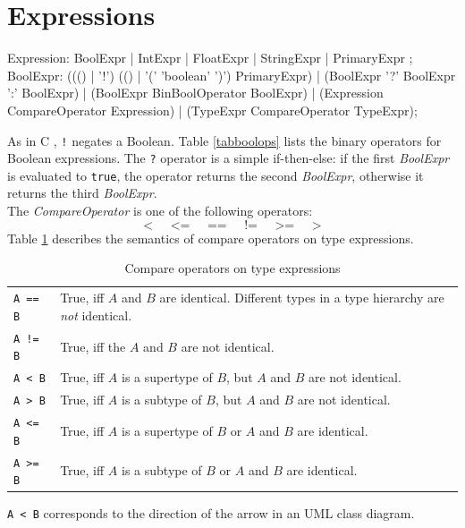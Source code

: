 \section{Expressions}
\label{expressions}
\begin{rail}
  Expression: BoolExpr | IntExpr | FloatExpr | StringExpr | PrimaryExpr ;  
  BoolExpr: ((() | '!') (() | '(' 'boolean' ')') PrimaryExpr) | (BoolExpr '?' BoolExpr ':' BoolExpr) | (BoolExpr BinBoolOperator BoolExpr) | (Expression CompareOperator Expression) | (TypeExpr CompareOperator TypeExpr);
\end{rail}
As in C \cite{isoc}, \texttt{!} negates a Boolean. Table \ref{tabboolops} lists the binary operators for Boolean expressions. The \texttt{?} operator is a simple if-then-else: if the first \emph{BoolExpr} is evaluated to \texttt{true}, the operator returns the second \emph{BoolExpr}, otherwise it returns the third \emph{BoolExpr}.\\
The \emph{CompareOperator} is one of the following operators:
\[ \texttt{<} \;\;\;\;\; \texttt{<=} \;\;\;\;\; \texttt{==} \;\;\;\;\; \texttt{!=} \;\;\;\;\; \texttt{>=} \;\;\;\;\; \texttt{>} \]
Table \ref{compandtypes} describes the semantics of compare operators on type expressions.\\
\begin{table}[htbp]
\label{compandtypes} 
  \centering
  \begin{tabularx}{\linewidth}{|l|X|} \hline
    \texttt{A == B} & True, iff $A$ and $B$ are identical. Different types in a type hierarchy are \emph{not} identical. \\
    \texttt{A != B} & True, iff the $A$ and $B$ are not identical. \\
    \texttt{A < B} & True, iff $A$ is a supertype of $B$, but $A$ and $B$ are not identical. \\
    \texttt{A > B} & True, iff $A$ is a subtype of $B$, but $A$ and $B$ are not identical. \\
    \texttt{A <= B} & True, iff $A$ is a supertype of $B$ or $A$ and $B$ are identical. \\
    \texttt{A >= B} & True, iff $A$ is a subtype of $B$ or $A$ and $B$ are identical. \\ \hline
  \end{tabularx}
  \begin{note}
  \texttt{A < B} corresponds to the direction of the arrow in an UML class diagram.
  \end{note}
\caption{Compare operators on type expressions}
\end{table}
